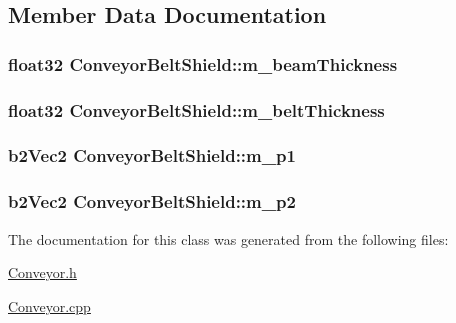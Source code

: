 \subsection{Member Data Documentation}
\hypertarget{classConveyorBeltShield_a026153ef70d96c0e835861467cc1a02c}{
\subsubsection[{m\-\_\-beam\-Thickness}]{\setlength{\rightskip}{0pt plus 5cm}float32 Conveyor\-Belt\-Shield\-::m\-\_\-beam\-Thickness}}\label{classConveyorBeltShield_a026153ef70d96c0e835861467cc1a02c}
\hypertarget{classConveyorBeltShield_a793a55bd4b34b9e2a6c89b457373f01d}{
\subsubsection[{m\-\_\-belt\-Thickness}]{\setlength{\rightskip}{0pt plus 5cm}float32 Conveyor\-Belt\-Shield\-::m\-\_\-belt\-Thickness}}\label{classConveyorBeltShield_a793a55bd4b34b9e2a6c89b457373f01d}
\hypertarget{classConveyorBeltShield_a28e34cf663b048519e8af9412b42c638}{
\subsubsection[{m\-\_\-p1}]{\setlength{\rightskip}{0pt plus 5cm}b2\-Vec2 Conveyor\-Belt\-Shield\-::m\-\_\-p1}}\label{classConveyorBeltShield_a28e34cf663b048519e8af9412b42c638}
\hypertarget{classConveyorBeltShield_a2bc6d812e1e50d7be3f7ddb97b29f0dd}{
\subsubsection[{m\-\_\-p2}]{\setlength{\rightskip}{0pt plus 5cm}b2\-Vec2 Conveyor\-Belt\-Shield\-::m\-\_\-p2}}\label{classConveyorBeltShield_a2bc6d812e1e50d7be3f7ddb97b29f0dd}


The documentation for this class was generated from the following files\-:\begin{DoxyCompactItemize}
\item 
\hyperlink{Conveyor_8h}{Conveyor.\-h}\item 
\hyperlink{Conveyor_8cpp}{Conveyor.\-cpp}\end{DoxyCompactItemize}
